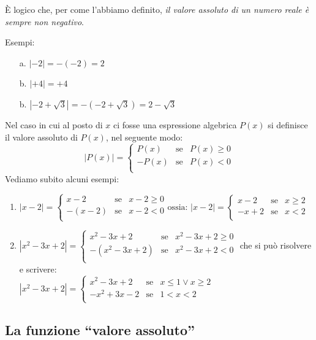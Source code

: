 È logico che, per come l'abbiamo definito,\textit{ il valore assoluto di un 
numero reale è sempre non negativo}.

Esempi:
\begin{enumerate}
\item[a.]
$|-2|=-(-2)=2$
\item[b.]
$|+4|=+4$
\item[b.]
$|-2+\sqrt{3}|=-(-2+\sqrt{3})=2-\sqrt{3}$
\end{enumerate} 
Nel caso in cui al posto di $x$ ci fosse una espressione algebrica  $P(x)$ si 
definisce il valore assoluto di $P(x)$, nel seguente modo:
$$|P(x)|=\left\lbrace 
\begin{array}{lcl}
P(x) & \text{se} & P(x)\geq 0 \\
-P(x) & \text{se} & P(x)< 0 \\
\end{array}
\right. 
$$
Vediamo subito alcuni esempi:
\begin{enumerate}
\item
$|x-2|=\left\lbrace 
\begin{array}{lcl}
x-2 & \text{se} & x-2\geq 0 \\
-(x-2) & \text{se} & x-2< 0 \\
\end{array}
\right.
\text{ossia: }
|x-2|=\left\lbrace 
\begin{array}{lcl}
x-2 & \text{se} & x\geq 2 \\
-x+2 & \text{se} & x<2 \\
\end{array}
\right.
$
\item
$|x^2-3x+2|=\left\lbrace 
\begin{array}{lcl}
x^2-3x+2 & \text{se} & x^2-3x+2\geq 0 \\
-(x^2-3x+2) & \text{se} & x^2-3x+2< 0 \\
\end{array}
\right.$
che si può risolvere e scrivere:\\[0.2cm]
$
|x^2-3x+2|=\left\lbrace 
\begin{array}{lcl}
x^2-3x+2 & \text{se} & x\leq 1 \vee x\geq 2 \\
-x^2+3x-2 & \text{se} & 1<x<2 \\
\end{array}
\right.
$
\end{enumerate}

\subsection{La funzione ``valore assoluto''}

